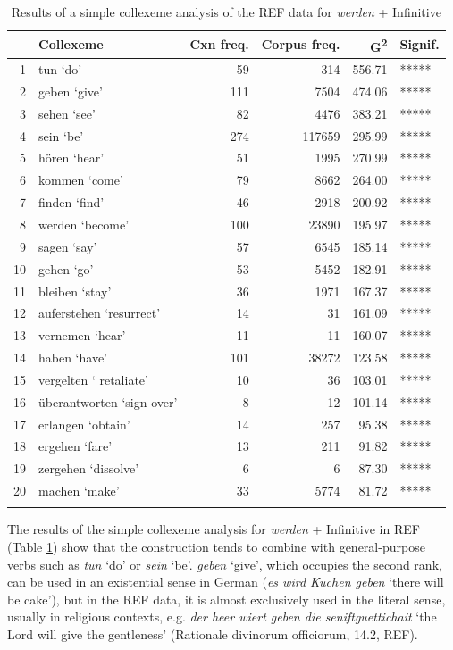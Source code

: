 \documentclass[output=paper,colorlinks,citecolor=brown]{langscibook}
\begin{document}

\begin{table}[ht]
\centering
\begin{tabular}{rlrrrl}
  \lsptoprule
 & Collexeme & Cxn freq. & Corpus freq. & G\textsuperscript{2} & Signif. \\ 
  \midrule
1 & tun `do'&  59 & 314 & 556.71 & ***** \\ 
  2 & geben `give'& 111 & 7504 & 474.06 & ***** \\ 
  3 & sehen `see'&  82 & 4476 & 383.21 & ***** \\ 
  4 & sein `be'& 274 & 117659 & 295.99 & ***** \\ 
  5 & hören `hear'&  51 & 1995 & 270.99 & ***** \\ 
  6 & kommen `come'&  79 & 8662 & 264.00 & ***** \\ 
  7 & finden `find'&  46 & 2918 & 200.92 & ***** \\ 
  8 & werden `become'& 100 & 23890 & 195.97 & ***** \\ 
  9 & sagen `say'&  57 & 6545 & 185.14 & ***** \\ 
  10 & gehen `go'&  53 & 5452 & 182.91 & ***** \\ 
  11 & bleiben `stay'&  36 & 1971 & 167.37 & ***** \\ 
  12 & auferstehen `resurrect'&  14 &  31 & 161.09 & ***** \\ 
  13 & vernemen `hear'&  11 &  11 & 160.07 & ***** \\ 
  14 & haben `have'& 101 & 38272 & 123.58 & ***** \\ 
  15 & vergelten ` retaliate'&  10 &  36 & 103.01 & ***** \\ 
  16 & überantworten `sign over'&   8 &  12 & 101.14 & ***** \\ 
  17 & erlangen `obtain'&  14 & 257 & 95.38 & ***** \\ 
  18 & ergehen `fare'  &  13 & 211 & 91.82 & ***** \\ 
  19 & zergehen `dissolve'&   6 &   6 & 87.30 & ***** \\ 
  20 & machen `make'&  33 & 5774 & 81.72 & ***** \\ 
   \lspbottomrule
\end{tabular}
\caption{Results of a simple collexeme analysis of the REF data for \textit{werden} + Infinitive} 
\label{simple_collex_werden_inf_ref}
\end{table}

The results of the simple collexeme analysis for \textit{werden} + Infinitive in REF (Table \ref{simple_collex_werden_inf_ref}) show that the construction tends to combine with general-purpose verbs such as \textit{tun} `do' or \textit{sein} `be'. \textit{geben} `give', which occupies the second rank, can be used in an existential sense in German (\textit{es wird Kuchen geben} `there will be cake'), but in the REF data, it is almost exclusively used in the literal sense, usually in religious contexts, e.g. \textit{der heer wiert geben die seniftguettichait} `the Lord will give the gentleness' (Rationale divinorum officiorum, 14.2, REF). 
\end{document}
